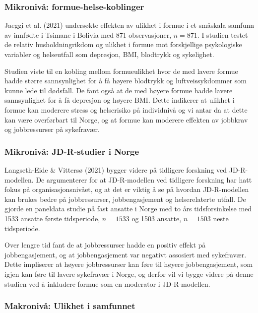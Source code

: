 \documentclass[
  12pt,
  a4paper,
  DIV=11,
  numbers=noendperiod]{scrartcl}
\begin{document}
\subsubsection{Mikronivå:
formue-helse-koblinger}\label{mikronivuxe5-formue-helse-koblinger}

Jaeggi et al. (2021) undersøkte effekten av ulikhet i formue i et
småskala samfunn av innfødte i Tsimane i Bolivia med 871 observasjoner,
\(n = 871\). I studien testet de relativ husholdningrikdom og ulikhet i
formue mot forskjellige psykologiske variabler og helseutfall som
depresjon, BMI, blodtrykk og sykelighet.

Studien viste til en kobling mellom formueulikhet hvor de med lavere
formue hadde større sannsynlighet for å få høyere blodtrykk og
luftveissykdommer som kunne lede til dødsfall. De fant også at de med
høyere formue hadde lavere sannsynlighet for å få depresjon og høyere
BMI. Dette indikerer at ulikhet i formue kan moderere stress og
helserisiko på individnivå og vi antar da at dette kan være overførbart
til Norge, og at formue kan moderere effekten av jobbkrav og
jobbressurser på sykefravær.

\subsubsection{Mikronivå: JD-R-studier i
Norge}\label{mikronivuxe5-jd-r-studier-i-norge}

Langseth-Eide \& Vittersø (2021) bygger videre på tidligere forskning
ved JD-R-modellen. De argumenterer for at JD-R-modellen ved tidligere
forskning har hatt fokus på organisasjonsnivået, og at det er viktig å
se på hvordan JD-R-modellen kan brukes bedre på jobbressurser,
jobbengasjement og helserelaterte utfall. De gjorde en paneldata studie
på fast ansatte i Norge med to års tidsforsinkelse med 1533 ansatte
første tidsperiode, \(n =1533\) og 1503 ansatte, \(n = 1503\) neste
tidsperiode.

Over lengre tid fant de at jobbressurser hadde en positiv effekt på
jobbengasjement, og at jobbengasjement var negativt assosiert med
sykefravær. Dette impliserer at høyere jobbressurser kan føre til høyere
jobbengasjement, som igjen kan føre til lavere sykefravær i Norge, og
derfor vil vi bygge videre på denne studien ved å inkludere formue som
en moderator i JD-R-modellen.

\subsubsection{Makronivå: Ulikhet i
samfunnet}\label{makronivuxe5-ulikhet-i-samfunnet}
\end{document}
